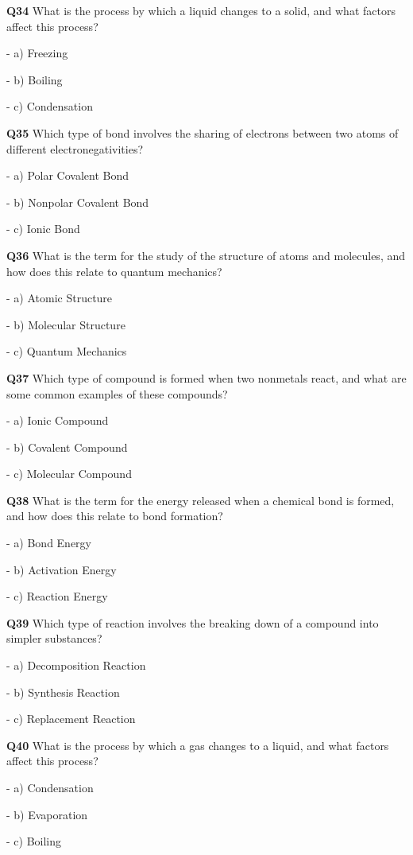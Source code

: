 \textbf{Q34} What is the process by which a liquid changes to a solid, and what factors affect this process?\par
\quad - a) Freezing\par
\quad - b) Boiling\par
\quad - c) Condensation\par

\textbf{Q35} Which type of bond involves the sharing of electrons between two atoms of different electronegativities?\par
\quad - a) Polar Covalent Bond\par
\quad - b) Nonpolar Covalent Bond\par
\quad - c) Ionic Bond\par

\textbf{Q36} What is the term for the study of the structure of atoms and molecules, and how does this relate to quantum mechanics?\par
\quad - a) Atomic Structure\par
\quad - b) Molecular Structure\par
\quad - c) Quantum Mechanics\par

\textbf{Q37} Which type of compound is formed when two nonmetals react, and what are some common examples of these compounds?\par
\quad - a) Ionic Compound\par
\quad - b) Covalent Compound\par
\quad - c) Molecular Compound\par

\textbf{Q38} What is the term for the energy released when a chemical bond is formed, and how does this relate to bond formation?\par
\quad - a) Bond Energy\par
\quad - b) Activation Energy\par
\quad - c) Reaction Energy\par

\textbf{Q39} Which type of reaction involves the breaking down of a compound into simpler substances?\par
\quad - a) Decomposition Reaction\par
\quad - b) Synthesis Reaction\par
\quad - c) Replacement Reaction\par

\textbf{Q40} What is the process by which a gas changes to a liquid, and what factors affect this process?\par
\quad - a) Condensation\par
\quad - b) Evaporation\par
\quad - c) Boiling\par

